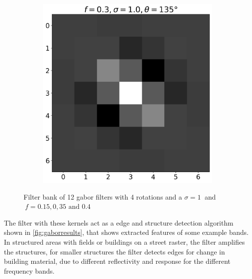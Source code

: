 \documentclass[12pt,a4paper, english,twoside]{article}
\begin{document}
\begin{figure}[!htbp]
\begin{subfigure}[b]{0.3\textwidth}
      \end{subfigure}
      \begin{subfigure}[b]{0.3\textwidth}
        \includegraphics[width=\textwidth]{img/K11.png}
      \end{subfigure}
      \caption{Filter bank of 12 gabor filters with 4 rotations and a $\sigma=1\ $ and $\ f = 0.15, 0,35 \text{ and } 0.4$\label{fig:gaborbank}}%
    \end{figure}
%  
    \noindent
    The filter with these kernels act as a edge and structure detection algorithm shown in \cref{fig:gaborresults}, that shows extracted features of some example bands.
    In structured areas with fields or buildings on a street raster, the filter amplifies the structures, for smaller structures the filter detects edges for change in building material, due to different reflectivity and response for the different frequency bands. 
\end{document}
